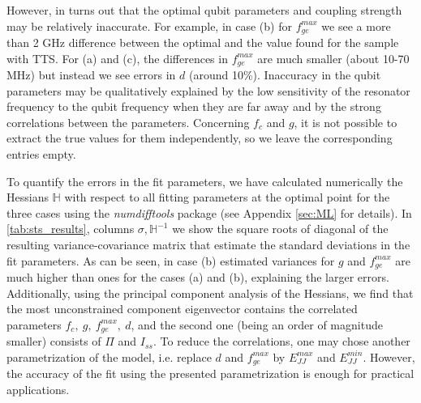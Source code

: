 \documentclass[%
 aip,
 draft,
 amsmath,amssymb,
 reprint,%
]{revtex4-1}
\begin{document}
However, in turns out that the optimal qubit parameters and coupling strength may be relatively inaccurate. For example, in case (b) for $f_{ge}^{max}$ we see a more than 2 GHz difference between the optimal and the  value found for the sample with TTS. For (a) and (c), the differences in $f_{ge}^{max}$ are much smaller (about 10-70 MHz) but instead we see errors in $d$ (around 10\%). Inaccuracy in the qubit parameters may be qualitatively explained by the low sensitivity of the resonator frequency to the qubit frequency when they are far away and by the strong correlations between the parameters. Concerning $f_c$ and $g$, it is not possible to extract the true values for them independently, so we leave the corresponding entries empty.

To quantify the errors in the fit parameters, we have calculated numerically the Hessians $\mathbb{H}$ with respect to all fitting parameters at the optimal point for the three cases using the \textit{numdifftools}\cite{numdifftools} package (see Appendix \ref{sec:ML} for details). In \autoref{tab:sts_results}, columns $\sigma, \mathbb{H}^{-1}$ we show the square roots of diagonal of the resulting variance-covariance matrix that estimate the standard deviations in the fit parameters. As can be seen, in case (b) estimated variances for $g$ and $f_{ge}^{max}$ are much higher than ones for the cases (a) and (b), explaining the larger errors. Additionally, using the principal component analysis of the Hessians, we find that the most unconstrained component eigenvector contains the correlated parameters $f_c,\ g,\ f_{ge}^{max},\ d$, and the second one (being an order of magnitude smaller) consists of $\Pi$ and $I_{ss}$. To reduce the correlations, one may chose another parametrization of the model, i.e. replace $d$ and $f_{ge}^{max}$ by $ E_{JJ}^{max} $ and $ E_{JJ}^{min} $. However, the accuracy of the fit using the presented parametrization is enough for practical applications.
\end{document}
